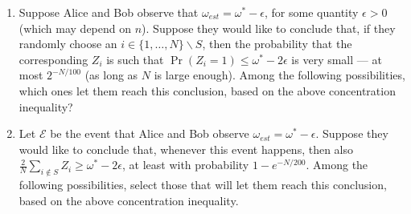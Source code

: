 \begin{exercises}
\begin{enumerate}
\item Suppose Alice and Bob observe that $\omega_{est} = \omega^* - \epsilon$, for some quantity $\epsilon>0$ (which may depend on $n$). Suppose they would like to conclude that, if they randomly choose an $i\in\{1,\ldots,N\}\backslash S$, then the probability that the corresponding $Z_i$ is such that $\Pr(Z_i=1)\leq \omega^*-2\epsilon$ is very small --- at most $2^{-N/100}$ (as long as $N$ is large enough). Among the following possibilities, which ones let them reach this conclusion, based on the above concentration inequality?
\item Let $\mathcal{E}$ be the event that Alice and Bob observe $\omega_{est} = \omega^* - \epsilon$. Suppose they would like to conclude that, whenever this event happens, then also $\frac{2}{N}\sum_{i\notin S} Z_i \geq \omega^*-2\epsilon$, at least with probability $1-e^{-N/200}$. Among the following possibilities, select those that will let them reach this conclusion, based on the above concentration inequality.

\end{enumerate}
\end{exercises}

